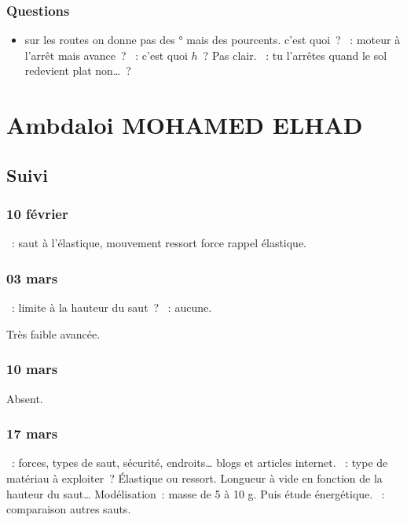 \documentclass[a4paper, 11pt, final, garamond]{book}
\begin{document}
\subsection{Questions}
\label{ssec:label}
\begin{itemize}
  \item sur les routes on donne pas des ° mais des pourcents. c'est quoi~?
  ~: moteur à l'arrêt mais avance~?
  ~: c'est quoi $h$~? Pas clair.
  ~: tu l'arrêtes quand le sol redevient plat non…~?
\end{itemize}

\chapter{Ambdaloi \textsc{MOHAMED ELHAD}}
\label{ch:ambdaloi}
\section{Suivi}
\subsection{10 février}
\begin{itemize}
    ~: saut à l'élastique, mouvement ressort force rappel élastique.
\end{itemize}

\subsection{03 mars}

\begin{itemize}
    ~: limite à la hauteur du saut~?
    ~: aucune.
\end{itemize}

\begin{center}
    Très faible avancée.
\end{center}

\subsection{10 mars}
\begin{center}
    Absent.
\end{center}

\subsection{17 mars}
\begin{itemize}
    ~: forces, types de saut, sécurité, endroits… blogs et articles
        internet.
    ~: type de matériau à exploiter~? Élastique ou ressort. Longueur
        à vide en fonction de la hauteur du saut… Modélisation~: masse de 5 à 10
        g. Puis étude énergétique.
    ~: comparaison autres sauts.
\end{itemize}
\end{document}
